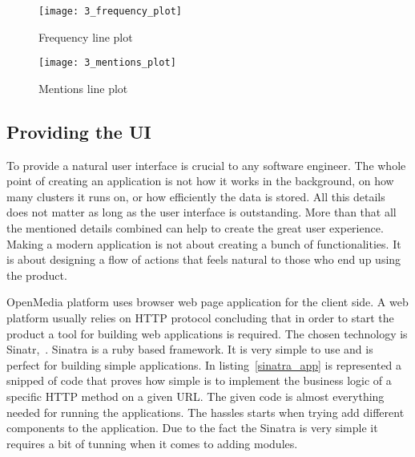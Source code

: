 \begin{figure}[!ht]
\centering
\texttt{[image: 3\_frequency\_plot]}
\caption{Frequency line plot}\label{frequency_plot}
\end{figure}

\begin{figure}[!ht]
\centering
\texttt{[image: 3\_mentions\_plot]}
\caption{Mentions line plot}\label{mentions_plot}
\end{figure}

\clearpage
{}
\subsection{Providing the UI}
To provide a natural user interface is crucial to any software engineer. The whole point of creating an application is not how it works in the background, on how many clusters it runs on, or how efficiently the data is stored. All this details does not matter as long as the user interface is outstanding. More than that all the mentioned details combined can help to create the great user experience. Making a modern application is not about creating a bunch of functionalities. It is about designing a flow of actions that feels natural to those who end up using the product.

OpenMedia platform uses browser web page application for the client side. A web platform usually relies on HTTP protocol concluding that in order to start the product a tool for building web applications is required. The chosen technology is \mbox{Sinatr, \cite{sinatra}}. Sinatra is a ruby based framework. It is very simple to use and is perfect for building simple applications. In \mbox{listing \ref{sinatra_app}} is represented a snipped of code that proves how simple is to implement the business logic of a specific HTTP method on a given URL. The given code is almost everything needed for running the applications. The hassles starts when trying add different components to the application. Due to the fact the Sinatra is very simple it requires a bit of tunning when it comes to adding modules.



